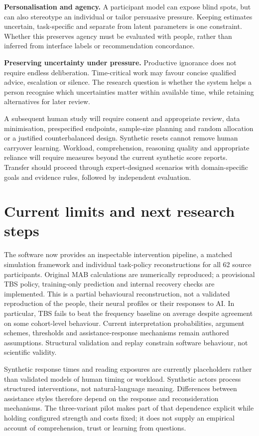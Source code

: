 \documentclass[11pt,a4paper]{article}
\begin{document}
\textbf{Personalisation and agency.} A participant model can expose blind spots, but can also stereotype an individual or tailor persuasive pressure. Keeping estimates uncertain, task-specific and separate from latent parameters is one constraint. Whether this preserves agency must be evaluated with people, rather than inferred from interface labels or recommendation concordance.

\textbf{Preserving uncertainty under pressure.} Productive ignorance does not require endless deliberation. Time-critical work may favour concise qualified advice, escalation or silence. The research question is whether the system helps a person recognise which uncertainties matter within available time, while retaining alternatives for later review.

A subsequent human study will require consent and appropriate review, data minimisation, prespecified endpoints, sample-size planning and random allocation or a justified counterbalanced design. Synthetic resets cannot remove human carryover learning. Workload, comprehension, reasoning quality and appropriate reliance will require measures beyond the current synthetic score reports. Transfer should proceed through expert-designed scenarios with domain-specific goals and evidence rules, followed by independent evaluation.

\section{Current limits and next research steps}
The software now provides an inspectable intervention pipeline, a matched simulation framework and individual task-policy reconstructions for all 62 source participants. Original MAB calculations are numerically reproduced; a provisional TBS policy, training-only prediction and internal recovery checks are implemented. This is a partial behavioural reconstruction, not a validated reproduction of the people, their neural profiles or their responses to AI. In particular, TBS fails to beat the frequency baseline on average despite agreement on some cohort-level behaviour. Current interpretation probabilities, argument schemes, thresholds and assistance-response mechanisms remain authored assumptions. Structural validation and replay constrain software behaviour, not scientific validity.

Synthetic response times and reading exposures are currently placeholders rather than validated models of human timing or workload. Synthetic actors process structured interventions, not natural-language meaning. Differences between assistance styles therefore depend on the response and reconsideration mechanisms. The three-variant pilot makes part of that dependence explicit while holding configured strength and costs fixed; it does not supply an empirical account of comprehension, trust or learning from questions.
\end{document}
